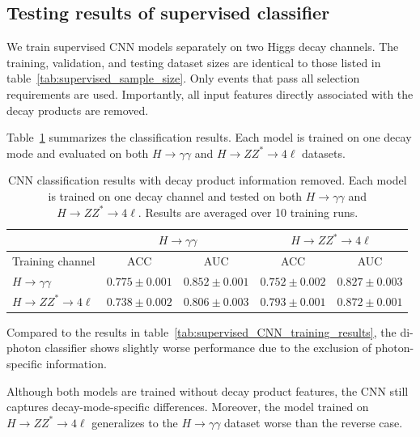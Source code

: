 \documentclass[12pt]{article}
\begin{document}
    \subsection{Testing results of supervised classifier}%
    \label{sub:testing_results_of_supervised_classifier}
		We train supervised CNN models separately on two Higgs decay channels. The training, validation, and testing dataset sizes are identical to those listed in table~\ref{tab:supervised_sample_size}. Only events that pass all selection requirements are used. Importantly, all input features directly associated with the decay products are removed.

		Table~\ref{tab:supervised_CNN_training_results_remove_product_diphoton_ZZ4l} summarizes the classification results. Each model is trained on one decay mode and evaluated on both $H \to \gamma\gamma$ and $H \to ZZ^* \to 4\ell$ datasets.
        \begin{table}[htpb]
            \centering
            \caption{CNN classification results with decay product information removed. Each model is trained on one decay channel and tested on both $H \to \gamma\gamma$ and $ H\to ZZ^* \to 4\ell$. Results are averaged over 10 training runs.}
            \label{tab:supervised_CNN_training_results_remove_product_diphoton_ZZ4l}
            \begin{tabular}{l|cc|cc}
                                     &\multicolumn{2}{c|}{$H\to\gamma\gamma$}&\multicolumn{2}{c}{$H\to ZZ^*\to 4\ell$}\\ \hline
                Training channel     & ACC               & AUC               & ACC               & AUC                \\ \hline
                $H\to\gamma\gamma$   & $0.775 \pm 0.001$ & $0.852 \pm 0.001$ & $0.752 \pm 0.002$ & $0.827 \pm 0.003$  \\
                $H\to ZZ^*\to 4\ell$ & $0.738 \pm 0.002$ & $0.806 \pm 0.003$ & $0.793 \pm 0.001$ & $0.872 \pm 0.001$ 
            \end{tabular}
        \end{table}
		Compared to the results in table~\ref{tab:supervised_CNN_training_results}, the di-photon classifier shows slightly worse performance due to the exclusion of photon-specific information.

		Although both models are trained without decay product features, the CNN still captures decay-mode-specific differences. Moreover, the model trained on $H \to ZZ^* \to 4\ell$ generalizes to the $H \to \gamma\gamma$ dataset worse than the reverse case.
\end{document}
